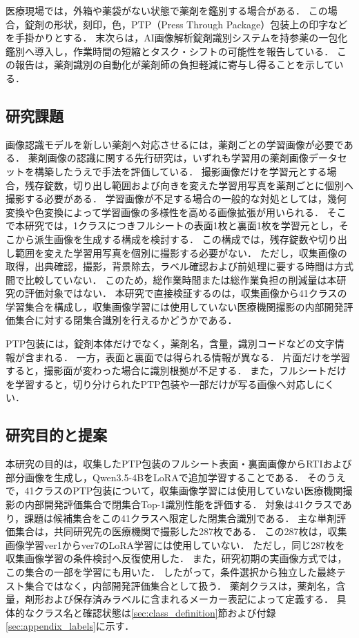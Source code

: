 \documentclass[uplatex,dvipdfmx]{jsarticle}
\begin{document}
医療現場では，外箱や薬袋がない状態で薬剤を鑑別する場合がある．
この場合，錠剤の形状，刻印，色，PTP（Press Through Package）包装上の印字などを手掛かりとする．
末次らは，AI画像解析錠剤識別システムを持参薬の一包化鑑別へ導入し，作業時間の短縮とタスク・シフトの可能性を報告している\cite{suetsugu2026ai}．
この報告は，薬剤識別の自動化が薬剤師の負担軽減に寄与し得ることを示している．

\subsection{研究課題}

画像認識モデルを新しい薬剤へ対応させるには，薬剤ごとの学習画像が必要である．
薬剤画像の認識に関する先行研究は，いずれも学習用の薬剤画像データセットを構築したうえで手法を評価している\cite{heo2023pill,radli2024word,radli2024metric}．
撮影画像だけを学習元とする場合，残存錠数，切り出し範囲および向きを変えた学習用写真を薬剤ごとに個別へ撮影する必要がある．
学習画像が不足する場合の一般的な対処としては，幾何変換や色変換によって学習画像の多様性を高める画像拡張が用いられる\cite{shorten2019augmentation}．
そこで本研究では，1クラスにつきフルシートの表面1枚と裏面1枚を学習元とし，そこから派生画像を生成する構成を検討する．
この構成では，残存錠数や切り出し範囲を変えた学習用写真を個別に撮影する必要がない．
ただし，収集画像の取得，出典確認，撮影，背景除去，ラベル確認および前処理に要する時間は方式間で比較していない．
このため，総作業時間または総作業負担の削減量は本研究の評価対象ではない．
本研究で直接検証するのは，収集画像から41クラスの学習集合を構成し，収集画像学習には使用していない医療機関撮影の内部開発評価集合に対する閉集合識別を行えるかどうかである．

PTP包装には，錠剤本体だけでなく，薬剤名，含量，識別コードなどの文字情報が含まれる．
一方，表面と裏面では得られる情報が異なる．
片面だけを学習すると，撮影面が変わった場合に識別根拠が不足する．
また，フルシートだけを学習すると，切り分けられたPTP包装や一部だけが写る画像へ対応しにくい．

\subsection{研究目的と提案}

本研究の目的は，収集したPTP包装のフルシート表面・裏面画像からRTIおよび部分画像を生成し，Qwen3.5-4BをLoRAで追加学習することである．
そのうえで，41クラスのPTP包装について，収集画像学習には使用していない医療機関撮影の内部開発評価集合で閉集合Top-1識別性能を評価する．
対象は41クラスであり，課題は候補集合をこの41クラスへ限定した閉集合識別である．
主な単剤評価集合は，共同研究先の医療機関で撮影した287枚である．
この287枚は，収集画像学習ver1からver7のLoRA学習には使用していない．
ただし，同じ287枚を収集画像学習の条件検討へ反復使用した．
また，研究初期の実画像方式では，この集合の一部を学習にも用いた．
したがって，条件選択から独立した最終テスト集合ではなく，内部開発評価集合として扱う．
薬剤クラスは，薬剤名，含量，剤形および保存済みラベルに含まれるメーカー表記によって定義する．
具体的なクラス名と確認状態は\ref{sec:class_definition}節および付録\ref{sec:appendix_labels}に示す．
\end{document}

